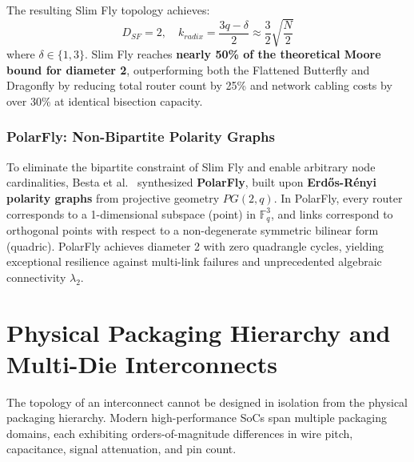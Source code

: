 The resulting Slim Fly topology achieves:
\begin{equation}
D_{SF} = 2, \quad k_{radix} = \frac{3q - \delta}{2} \approx \frac{3}{2} \sqrt{\frac{N}{2}}
\end{equation}
where $\delta \in \{1, 3\}$. Slim Fly reaches \textbf{nearly 50\% of the theoretical Moore bound for diameter 2}, outperforming both the Flattened Butterfly and Dragonfly by reducing total router count by 25\% and network cabling costs by over 30\% at identical bisection capacity.

\subsubsection{PolarFly: Non-Bipartite Polarity Graphs}
To eliminate the bipartite constraint of Slim Fly and enable arbitrary node cardinalities, Besta et al.~\cite{Besta2022} synthesized \textbf{PolarFly}, built upon \textbf{Erd\H{o}s-R\'enyi polarity graphs} from projective geometry $PG(2, q)$. In PolarFly, every router corresponds to a 1-dimensional subspace (point) in $\mathbb{F}_q^3$, and links correspond to orthogonal points with respect to a non-degenerate symmetric bilinear form (quadric). PolarFly achieves diameter 2 with zero quadrangle cycles, yielding exceptional resilience against multi-link failures and unprecedented algebraic connectivity $\lambda_2$.

\section{Physical Packaging Hierarchy and Multi-Die Interconnects}
\label{sec:ch4_packaging}

The topology of an interconnect cannot be designed in isolation from the physical packaging hierarchy. Modern high-performance SoCs span multiple packaging domains, each exhibiting orders-of-magnitude differences in wire pitch, capacitance, signal attenuation, and pin count.

